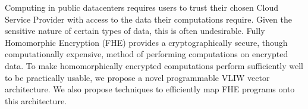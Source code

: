 Computing in public datacenters requires users to trust their chosen Cloud Service Provider with access to the data their computations require. 
Given the sensitive nature of certain types of data, this is often undesirable.
Fully Homomorphic Encryption (FHE) provides a cryptographically secure, though computationally expensive,
method of performing computations on encrypted data.
To make homomorphically encrypted computations perform sufficiently well to be practically usable, 
we propose a novel programmable VLIW vector architecture.
We also propose techniques to efficiently map FHE programs onto this architecture.
